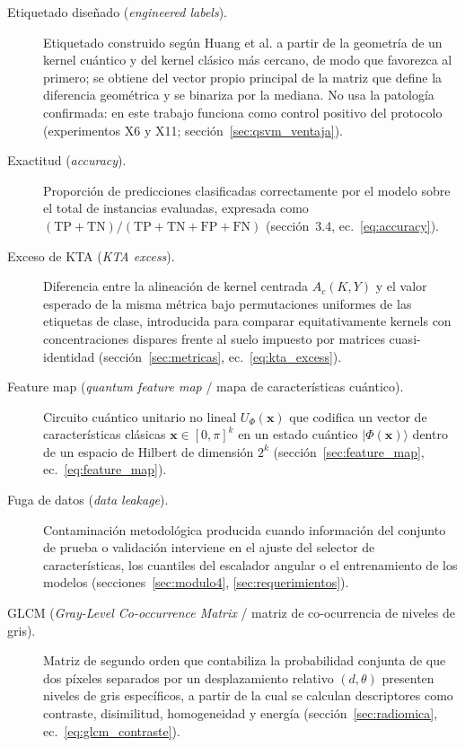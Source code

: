 \begin{description}
  \item[Etiquetado diseñado (\textit{engineered labels}).] Etiquetado construido según Huang et al. a partir de la geometría de un kernel cuántico y del kernel clásico más cercano, de modo que favorezca al primero; se obtiene del vector propio principal de la matriz que define la diferencia geométrica y se binariza por la mediana. No usa la patología confirmada: en este trabajo funciona como control positivo del protocolo (experimentos X6 y X11; sección~\ref{sec:qsvm_ventaja}).

  \item[Exactitud (\textit{accuracy}).] Proporción de predicciones clasificadas correctamente por el modelo sobre el total de instancias evaluadas, expresada como $(\mathrm{TP} + \mathrm{TN}) / (\mathrm{TP} + \mathrm{TN} + \mathrm{FP} + \mathrm{FN})$ (sección~3.4, ec.~\ref{eq:accuracy}).

  \item[Exceso de KTA (\textit{KTA excess}).] Diferencia entre la alineación de kernel centrada $A_c(K, Y)$ y el valor esperado de la misma métrica bajo permutaciones uniformes de las etiquetas de clase, introducida para comparar equitativamente kernels con concentraciones dispares frente al suelo impuesto por matrices cuasi-identidad (sección~\ref{sec:metricas}, ec.~\ref{eq:kta_excess}).

  \item[Feature map (\textit{quantum feature map} / mapa de características cuántico).] Circuito cuántico unitario no lineal $U_\Phi(\mathbf{x})$ que codifica un vector de características clásicas $\mathbf{x} \in [0, \pi]^k$ en un estado cuántico $|\Phi(\mathbf{x})\rangle$ dentro de un espacio de Hilbert de dimensión $2^k$ (sección~\ref{sec:feature_map}, ec.~\ref{eq:feature_map}).

  \item[Fuga de datos (\textit{data leakage}).] Contaminación metodológica producida cuando información del conjunto de prueba o validación interviene en el ajuste del selector de características, los cuantiles del escalador angular o el entrenamiento de los modelos (secciones~\ref{sec:modulo4}, \ref{sec:requerimientos}).

  \item[GLCM (\textit{Gray-Level Co-occurrence Matrix} / matriz de co-ocurrencia de niveles de gris).] Matriz de segundo orden que contabiliza la probabilidad conjunta de que dos píxeles separados por un desplazamiento relativo $(d, \theta)$ presenten niveles de gris específicos, a partir de la cual se calculan descriptores como contraste, disimilitud, homogeneidad y energía (sección~\ref{sec:radiomica}, ec.~\ref{eq:glcm_contraste}).


\end{description}
